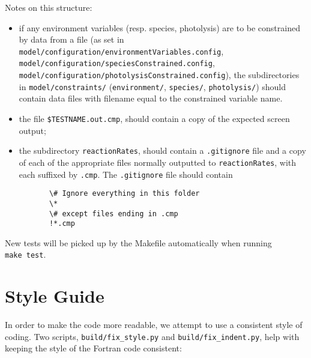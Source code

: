Notes on this structure:

\begin{itemize}
\item if any environment variables (resp. species, photolysis) are to
  be constrained by data from a file (as set in
  \texttt{model/configuration/environmentVariables.config},
  \texttt{model/configuration/speciesConstrained.config},\\
  \texttt{model/configuration/photolysisConstrained.config}), the
  subdirectories in \texttt{model/constraints/}
  (\texttt{environment/}, \texttt{species/}, \texttt{photolysis/})
  should contain data files with filename equal to the constrained
  variable name.
\item the file \texttt{\$TESTNAME.out.cmp}, should contain a copy of
  the expected screen output;
\item the subdirectory \texttt{reactionRates}, should contain a
  \texttt{.gitignore} file and a copy of each of the appropriate files
  normally outputted to \texttt{reactionRates}, with each suffixed by
  \texttt{.cmp}. The \texttt{.gitignore} file should contain

\begin{verbatim}
       \# Ignore everything in this folder
       \*
       \# except files ending in .cmp
       !*.cmp
\end{verbatim}
\end{itemize}

New tests will be picked up by the Makefile automatically when running
\texttt{make\ test}.

\section{Style Guide} \label{sec:style-guide}

In order to make the code more readable, we attempt to use a
consistent style of coding. Two scripts, \texttt{build/fix\_style.py}
and \texttt{build/fix\_indent.py}, help with keeping the style of the
Fortran code consistent:


